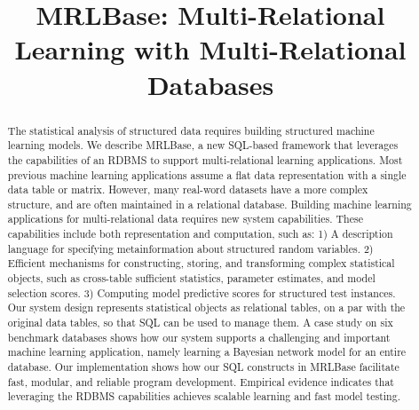 \documentclass{acm_proc_article-sp}
\begin{document}
\title{MRLBase: Multi-Relational Learning with Multi-Relational Databases}

\maketitle  
\begin{abstract} 
The statistical analysis of structured data requires building structured machine learning models. We describe MRLBase, a new SQL-based framework that leverages the capabilities of an RDBMS to support multi-relational learning applications. Most previous machine learning applications assume a flat data representation with a single data table or matrix. However, many real-word datasets have a more complex structure, and are often maintained in a relational database.
Building machine learning applications for multi-relational data requires new system capabilities. These capabilities include both representation and computation, such as: 1) A description language for specifying metainformation about structured random variables. 2) Efficient mechanisms for constructing, storing, and transforming complex statistical objects, such as cross-table sufficient statistics, parameter estimates, and model selection scores. 3) Computing model predictive scores for structured test instances. Our system design represents statistical objects as  relational tables, on a par with the original data tables, so that SQL can be used  to manage them. A case study on six benchmark databases shows how our system supports a challenging and important machine learning application, namely learning a Bayesian network model for an entire database. Our implementation shows how our SQL constructs in MRLBase facilitate fast, modular, and reliable program development. Empirical evidence indicates that leveraging the RDBMS capabilities  achieves scalable learning and fast model testing.
\end{abstract}
%
\end{document}
